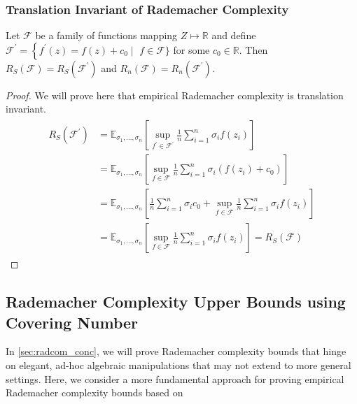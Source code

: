 \documentclass{article}
\begin{document}
\subsubsection{Translation Invariant of Rademacher Complexity }
\begin{thma}
Let $\mathcal{F}$ be a family of functions mapping $Z \mapsto \mathbb{R}$ and define $\mathcal{F}^{\prime}=\left\{f^{\prime}(z)=f(z)+c_{0} \mid\right.$ $f \in \mathcal{F}\}$ for some $c_{0} \in \mathbb{R}$. Then $R_{S}(\mathcal{F})=R_{S}\left(\mathcal{F}^{\prime}\right)$ and $R_{n}(\mathcal{F})=R_{n}\left(\mathcal{F}^{\prime}\right) .$
\end{thma} 
\begin{proof}
 We will prove here that empirical Rademacher complexity is translation invariant.
\begin{align*}
\begin{aligned}
R_{S}\left(\mathcal{F}^{\prime}\right) &=\mathbb{E}_{\sigma_{1}, \ldots, \sigma_{n}}\left[\sup _{f^{\prime} \in \mathcal{F}^{\prime}} \frac{1}{n} \sum_{i=1}^{n} \sigma_{i} f\left(z_{i}\right)\right] \\
&=\mathbb{E}_{\sigma_{1}, \ldots, \sigma_{n}}\left[\sup _{f \in \mathcal{F}} \frac{1}{n} \sum_{i=1}^{n} \sigma_{i}\left(f\left(z_{i}\right)+c_{0}\right)\right] \\
&=\mathbb{E}_{\sigma_{1}, \ldots, \sigma_{n}}\left[\frac{1}{n} \sum_{i=1}^{n} \sigma_{i} c_{0}+\sup _{f \in \mathcal{F}} \frac{1}{n} \sum_{i=1}^{n} \sigma_{i} f\left(z_{i}\right)\right] \\
&=\mathbb{E}_{\sigma_{1}, \ldots, \sigma_{n}}\left[\sup _{f \in \mathcal{F}} \frac{1}{n} \sum_{i=1}^{n} \sigma_{i} f\left(z_{i}\right)\right]=R_{S}(\mathcal{F})
\end{aligned}
\end{align*}
\end{proof} 

\subsection{Rademacher Complexity Upper Bounds using Covering Number}
In \cref{sec:radcom_conc}, we will prove Rademacher complexity bounds that hinge on elegant, ad-hoc algebraic manipulations that may not extend to more general settings. Here, we consider a more fundamental approach for proving empirical Rademacher complexity bounds based on  
\end{document}
